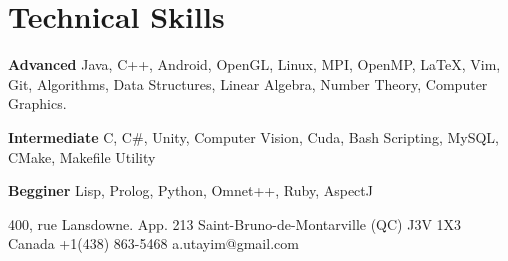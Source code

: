 \documentclass{tccv}
\begin{document}
\section{Technical Skills}

    {\textbf{Advanced}\break
    Java, C++, Android, OpenGL, Linux, MPI, OpenMP, \LaTeX, Vim, Git, Algorithms, Data Structures, Linear Algebra, Number Theory, Computer Graphics.
    \hfill\break


    \textbf{Intermediate}\break
    C, C\#, Unity, Computer Vision,  Cuda, Bash Scripting, MySQL, CMake, Makefile Utility
    \hfill\break

    \textbf{Begginer}\break
    Lisp, Prolog, Python, Omnet++, Ruby, AspectJ}


\personal
    {400, rue Lansdowne. App. 213\hfill\break 
     Saint-Bruno-de-Montarville (QC) J3V 1X3\hfill\break
    Canada}
    {+1(438) 863-5468}
    {a.utayim@gmail.com}
    
    
    
\end{document}
